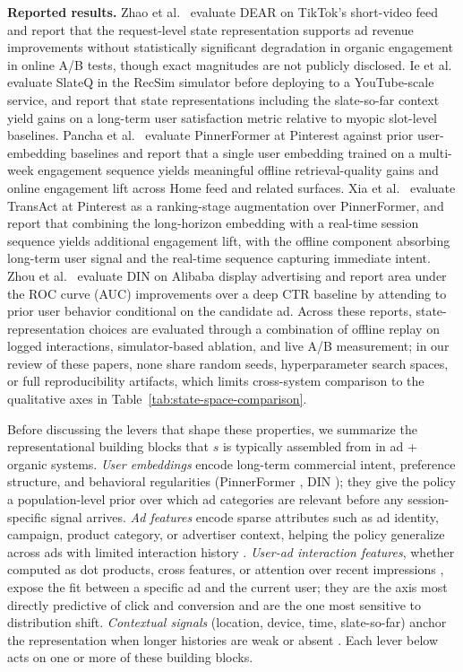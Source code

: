 \documentclass[manuscript,review,screen]{acmart}
\begin{document}
\textbf{Reported results.}
Zhao et al.\ \cite{zhao2021dear} evaluate DEAR on TikTok's short-video feed and report that the request-level state representation supports ad revenue improvements without statistically significant degradation in organic engagement in online A/B tests, though exact magnitudes are not publicly disclosed. Ie et al.\ \cite{ie2019slateq} evaluate SlateQ in the RecSim simulator \cite{ie2019recsim} before deploying to a YouTube-scale service, and report that state representations including the slate-so-far context yield gains on a long-term user satisfaction metric relative to myopic slot-level baselines. Pancha et al.\ \cite{pancha2022pinnerformer} evaluate PinnerFormer at Pinterest against prior user-embedding baselines and report that a single user embedding trained on a multi-week engagement sequence yields meaningful offline retrieval-quality gains and online engagement lift across Home feed and related surfaces. Xia et al.\ \cite{xia2023transact} evaluate TransAct at Pinterest as a ranking-stage augmentation over PinnerFormer, and report that combining the long-horizon embedding with a real-time session sequence yields additional engagement lift, with the offline component absorbing long-term user signal and the real-time sequence capturing immediate intent. Zhou et al.\ \cite{Zhou2018} evaluate DIN on Alibaba display advertising and report area under the ROC curve (AUC) improvements over a deep CTR baseline by attending to prior user behavior conditional on the candidate ad. Across these reports, state-representation choices are evaluated through a combination of offline replay on logged interactions, simulator-based ablation, and live A/B measurement; in our review of these papers, none share random seeds, hyperparameter search spaces, or full reproducibility artifacts, which limits cross-system comparison to the qualitative axes in Table~\ref{tab:state-space-comparison}.

Before discussing the levers that shape these properties, we summarize the representational building blocks that $s$ is typically assembled from in ad + organic systems. \textit{User embeddings} encode long-term commercial intent, preference structure, and behavioral regularities (PinnerFormer \cite{pancha2022pinnerformer}, DIN \cite{Zhou2018}); they give the policy a population-level prior over which ad categories are relevant before any session-specific signal arrives. \textit{Ad features} encode sparse attributes such as ad identity, campaign, product category, or advertiser context, helping the policy generalize across ads with limited interaction history \cite{mcmahan2013ad, cheng2016wide}. \textit{User-ad interaction features}, whether computed as dot products, cross features, or attention over recent impressions \cite{cheng2016wide, Zhou2018}, expose the fit between a specific ad and the current user; they are the axis most directly predictive of click and conversion and are the one most sensitive to distribution shift. \textit{Contextual signals} (location, device, time, slate-so-far) anchor the representation when longer histories are weak or absent \cite{zhao2021dear}. Each lever below acts on one or more of these building blocks.
\end{document}
